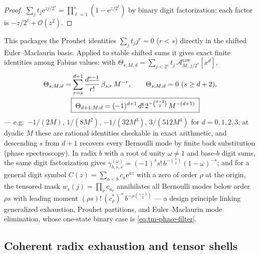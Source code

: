 \documentclass[11pt,oneside]{article}
\numberwithin{equation}{section}
\theoremstyle{definition}
\theoremstyle{remark}
\newcommand{\e}{\mathrm e}
\newcommand{\bigO}{\mathcal O}
\newcommand{\fall}[2]{#1^{\underline{#2}}}
\begin{document}
\begin{proof}
$\sum_j t_j\e^{zj/2^{s}}=\prod_{\ell=1}^{s}(1-\e^{z/2^{\ell}})$ by
binary digit factorization; each factor is
$-z/2^{\ell}+\bigO(z^{2})$.
\end{proof}

This packages the Prouhet identities $\sum_jt_jj^{r}=0$ ($r<s$)
directly in the shifted Euler--Maclaurin basis.  Applied to stable
shifted sums it gives exact finite identities among Fabius values:
with $\Theta_{s;M,d}=\sum_{j<2^{s}}t_j\,
\mathcal A^{\mathrm{raw}}_{M,\,j/2^{s}}[x^{d}]$,
\begin{align}
 \Theta_{s;M,d}
 &=\sum_{r=s}^{d+1}\frac{\fall d{r-1}}{r!}\,\beta_{s,r}\,M^{-r},
 \qquad
 \Theta_{s;M,d}=0\ (s\ge d+2),
 \notag\\
 &\phantom{=}\;
 \boxed{\;\Theta_{d+1;M,d}
 =(-1)^{d+1}\,d!\,2^{-\binom{d+2}2}\,M^{-(d+1)}\;}
 \label{eq:tm-phase-filter}
\end{align}
--- e.g.\ $-1/(2M)$, $1/(8M^{2})$, $-1/(32M^{3})$, $3/(512M^{4})$ for
$d=0,1,2,3$; at dyadic $M$ these are rational identities checkable in
exact arithmetic, and descending $s$ from $d+1$ recovers every
Bernoulli mode by finite back substitution (phase spectroscopy).  In
radix $b$ with a root of unity $\omega\ne1$ and base-$b$ digit sums,
the same digit factorization gives
$\gamma_{b,s,s}^{(\omega)}=(-1)^{s}s!\,b^{-\binom s2}(1-\omega)^{-s}$;
and for a general digit symbol
$C(z)=\sum_{a<b}c_a\e^{az}$ with a zero of order $\rho$ at the
origin, the tensored mask
$w_s(j)=\prod_\nu c_{a_\nu}$ annihilates all Bernoulli modes below
order $\rho s$ with leading moment
$(\rho s)!\,(c^{*}_{\rho})^{s}\,b^{-\rho\binom{s+1}2}$ --- a design
principle linking generalized exhaustion, Prouhet partitions, and
Euler--Maclaurin mode elimination, whose one-state binary case is
\eqref{eq:tm-phase-filter}.

\subsection{Coherent radix exhaustion and tensor shells}
\end{document}
